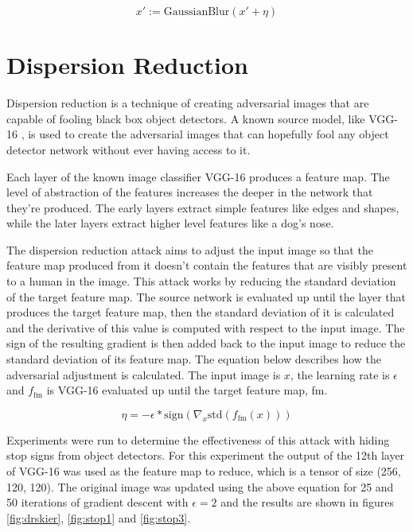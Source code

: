 \documentclass{article}
\begin{document}
\begin{equation}
    x' := \text{GaussianBlur}(x' + \eta)
\end{equation}

\section{Dispersion Reduction}
Dispersion reduction \cite{Lu_2020_CVPR} is a technique of creating adversarial images that are capable of fooling black box object detectors. A known source model, like VGG-16 \cite{simonyan2015deep}, is used to create the adversarial images that can hopefully fool any object detector network without ever having access to it.

Each layer of the known image classifier  VGG-16 produces a feature map. The level of abstraction of the features increases the deeper in the network that they're produced. The early layers extract simple features like edges and shapes, while the later layers extract higher level features like a dog's nose. \cite{olah2017feature}

The dispersion reduction attack aims to adjust the input image so that the feature map produced from it doesn't contain the features that are visibly present to a human in the image. This attack works by reducing the standard deviation of the target feature map. The source network is evaluated up until the layer that produces the target feature map, then the standard deviation of it is calculated and the derivative of this value is computed with respect to the input image. The sign of the resulting gradient is then added back to the input image to reduce the standard deviation of its feature map. The equation below describes how the adversarial adjustment is calculated. The input image is $x$, the learning rate is $\epsilon$ and $f_{\text{fm}}$ is VGG-16 evaluated up until the target feature map, fm.

\begin{equation}
    \eta = - \epsilon * \text{sign}(\nabla_x \text{std}(f_{\text{fm}}(x)))
\end{equation}

Experiments were run to determine the effectiveness of this attack with hiding stop signs from object detectors. For this experiment the output of the 12th layer of VGG-16 was used as the feature map to reduce, which is a tensor of size (256, 120, 120). The original image was updated using the above equation for 25 and 50 iterations of gradient descent with $\epsilon = 2$ and the results are shown in figures \ref{fig:drskier}, \ref{fig:stop1} and \ref{fig:stop3}.
\end{document}
